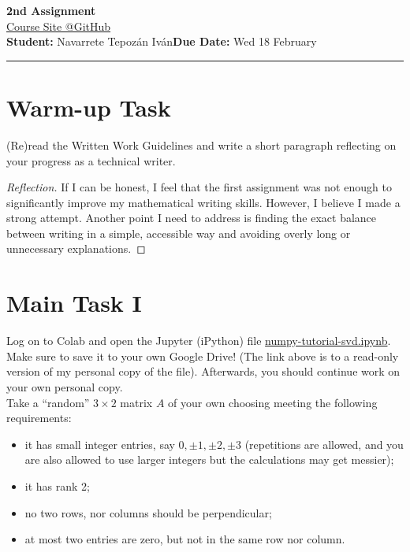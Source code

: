 \documentclass[12pt]{article}
\newcommand{\courseURL}{https://eduenez.github.io/MathAIspring2026UTSA}
\newcommand{\assignmentTitle}{2nd Assignment}
\newcommand{\studentName}{Navarrete Tepozán Iván}
\begin{document}
\begin{center}
    {\LARGE \textbf{\assignmentTitle}} \\
    \vspace{5pt}
    {\large \href{\courseURL}{Course Site @GitHub}} \\
    \vspace{10pt}
    \textbf{Student:} \studentName \hfill \textbf{Due Date:} {Wed 18 February}\\
    \rule{\linewidth}{0.4pt}
\end{center}

\section*{Warm-up Task}
\begin{problem}{}
(Re)read the Written Work Guidelines and write a short paragraph reflecting on your progress as a technical writer.
\end{problem}

\begin{proof}[Reflection]
If I can be honest, I feel that the first assignment was not enough to significantly improve my mathematical writing skills. However, I believe I made a strong attempt. Another point I need to address is finding the exact balance between writing in a simple, accessible way and avoiding overly long or unnecessary explanations.
\end{proof}

\section*{Main Task I}
Log on to Colab and open the Jupyter (iPython) file \href{https://colab.research.google.com/drive/1A5U2jgdtyVQZKHIIpqHub6X-aUqD-7mB?usp=sharing}{numpy-tutorial-svd.ipynb}. \\

Make sure to save it to your own Google Drive! (The link above is to a read-only version of my personal copy of the file). Afterwards, you should continue work on your own personal copy. \\

Take a ``random'' $3 \times 2$ matrix $A$ of your own choosing meeting the following requirements:
\begin{itemize}
    \item it has small integer entries, say $0, \pm 1, \pm 2, \pm 3$ (repetitions are allowed, and you are also allowed to use larger integers but the calculations may get messier);
    \item it has rank 2;
    \item no two rows, nor columns should be perpendicular;
    \item at most two entries are zero, but not in the same row nor column.
\end{itemize}
\end{document}
